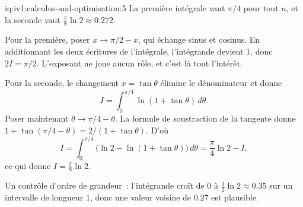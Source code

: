 \begin{solution}{iq:iv1:calculus-and-optimisation:5}
La première intégrale vaut $\pi/4$ pour tout $n$, et la seconde vaut $\frac{\pi}{8}\ln 2 \approx 0.272$.

Pour la première, poser $x \to \pi/2 - x$, qui échange sinus et cosinus. En additionnant les deux écritures de l'intégrale, l'intégrande devient 1, donc $2I = \pi/2$. L'exposant ne joue aucun rôle, et c'est là tout l'intérêt.

Pour la seconde, le changement $x = \tan\theta$ élimine le dénominateur et donne
\[
I = \int_0^{\pi/4}\ln(1 + \tan\theta)\,d\theta.
\]
Poser maintenant $\theta \to \pi/4 - \theta$. La formule de soustraction de la tangente donne $1 + \tan(\pi/4 - \theta) = 2/(1 + \tan\theta)$. D'où
\[
I = \int_0^{\pi/4}\bigl(\ln 2 - \ln(1 + \tan\theta)\bigr)\,d\theta = \frac{\pi}{4}\ln 2 - I,
\]
ce qui donne $I = \frac{\pi}{8}\ln 2$.

Un contrôle d'ordre de grandeur~: l'intégrande croît de 0 à $\frac12\ln 2 \approx 0.35$ sur un intervalle de longueur 1, donc une valeur voisine de $0.27$ est plausible.



\end{solution}

